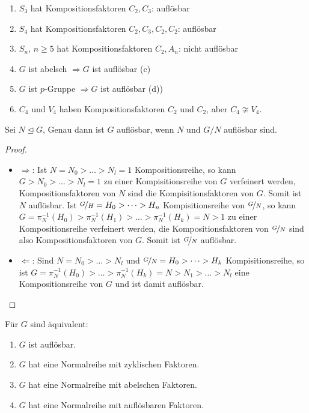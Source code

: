 \begin{example}
	\begin{enumerate}[label=(\alph*)]
		\item $S_3$ hat Kompositionsfaktoren $C_2, C_3$: auflösbar
		\item $S_4$ hat Kompositionsfaktoren $C_2,C_3,C_2,C_2$: auflösbar
		\item $S_n$, $n \geq 5$ hat Kompositionsfaktoren $C_2, A_n$: nicht auflösbar
		\item $G$ ist abelsch $\Longrightarrow G$ ist auflösbar (c)
		\item $G$ ist $p$-Gruppe $\Longrightarrow G$ ist auflösbar (d))
		\item $C_4 \text{ und } V_4$ haben Kompositionsfaktoren $C_2$ und $C_2$, aber $C_4 \not\cong V_4$.
	\end{enumerate}
\end{example}

\begin{lemma}
	Sei $N\unlhd G$, Genau dann ist $G$ auflösbar, wenn $N$ und $G/N$ auflösbar sind.
\end{lemma}

\begin{proof}
	\begin{itemize}
		\item $\Rightarrow$: Ist $N = N_0 > \dots > N_l = 1$ Kompositionsreihe, so kann $G > N_0 > \dots > N_l = 1$ zu einer Kompisitionsreihe von $G$ verfeinert werden, Kompositionsfaktoren von $N$ sind die Kompisitionsfaktoren von $G$. Somit ist $N$ auflösbar. Ist $\nicefrac{G}{H} = H_0 > \dots > H_n$ Kompisitionsreihe von $\nicefrac{G}{N}$, so kann $G = \pi^{-1}_{N}(H_0) > \pi^{-1}_{N}(H_1) > \dots > \pi^{-1}_{N}(H_k) = N > 1$ zu einer Kompositionsreihe verfeinert werden, die Kompositionsfaktoren von $\nicefrac{G}{N}$ sind also Kompositionsfaktoren von $G$. Somit ist $\nicefrac{G}{N}$ auflösbar.
		\item $\Leftarrow$: Sind $N = N_0 > \dots > N_l$ und $\nicefrac{G}{N}=H_0 > \dots > H_k$ Kompisitionsreihe, so ist $G = \pi^{-1}_{N}(H_0) > \dots > \pi^{-1}_{N}(H_k) = N > N_1 > \dots > N_l$ eine Kompositionsreihe von $G$ und ist damit auflösbar.
	\end{itemize}
\end{proof}

\begin{proposition}
	Für $G$ sind äquivalent:
	\begin{enumerate}
		\item $G$ ist auflösbar.
		\item $G$ hat eine Normalreihe mit zyklischen Faktoren.
		\item $G$ hat eine Normalreihe mit abelschen Faktoren.
		\item $G$ hat eine Normalreihe mit auflösbaren Faktoren.
	\end{enumerate}
\end{proposition}

